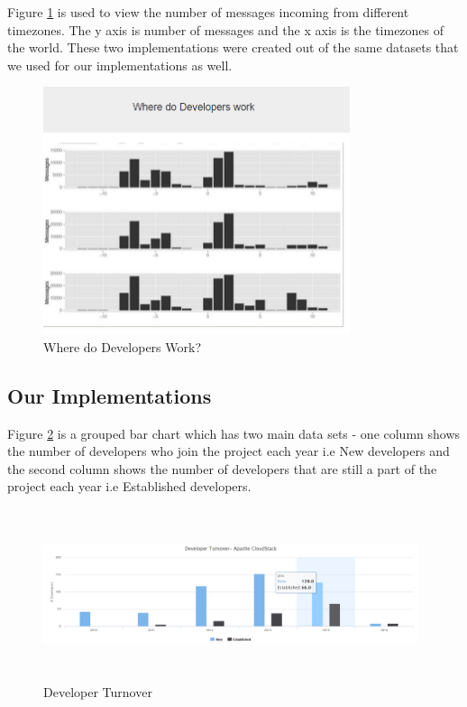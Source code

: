 \documentclass[seploa]{beavtex}
\begin{document}
Figure \ref{fig:devWork} is used to view the number of messages incoming from different timezones. The y axis is number of messages and the x axis is the timezones of the world. These two implementations were created out of the same datasets that we used for our implementations as well.

\begin{figure}[H]
\begin{center}
\includegraphics[width=90mm]{image12.PNG}
\end{center}
\caption{Where do Developers Work?}
\label{fig:devWork}
\end{figure}

\subsection{Our Implementations}
Figure \ref{fig:devTurn} is a grouped bar chart which has two main data sets - one column shows the number of developers who join the project each year i.e New developers and the second column shows the number of developers that are still a part of the project each year i.e Established developers.

\begin{figure}[H]
\centering
\includegraphics[width=110mm,height=50mm]{image1.PNG}
\caption{Developer Turnover}
\label{fig:devTurn}
\end{figure}
\end{document}
